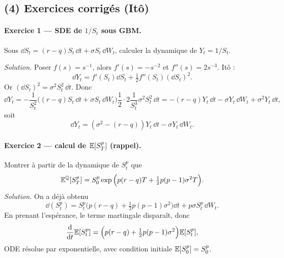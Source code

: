 \subsection*{(4) Exercices corrigés (Itô)}
\paragraph{Exercice 1 --- SDE de $1/S_t$ sous GBM.}
Sous $\dd S_t=(r-q)S_t\,\dd t+\sigma S_t\,\dd W_t$, calculer la dynamique de $Y_t=1/S_t$.

\emph{Solution.}
Poser $f(s)=s^{-1}$, alors $f'(s)=-s^{-2}$ et $f''(s)=2s^{-3}$.
Itô :
\[
\dd Y_t=f'(S_t)\dd S_t+\tfrac12 f''(S_t)(\dd S_t)^2.
\]
Or $(\dd S_t)^2=\sigma^2 S_t^2\,\dd t$.
Donc
\[
\dd Y_t=-\frac{1}{S_t^2}\big((r-q)S_t\,\dd t+\sigma S_t\,\dd W_t\big)
\frac12\cdot 2\frac{1}{S_t^3}\sigma^2 S_t^2\,\dd t
=-(r-q)Y_t\,\dd t-\sigma Y_t\,\dd W_t+\sigma^2 Y_t\,\dd t,
\]
soit
\[
\boxed{\dd Y_t=(\sigma^2-(r-q))Y_t\,\dd t-\sigma Y_t\,\dd W_t.}
\]

\paragraph{Exercice 2 --- calcul de $\mathbb{E}[S_T^p]$ (rappel).}
Montrer à partir de la dynamique de $S_t^p$ que
\[
\mathbb{E}^{\mathbb{Q}}[S_T^p]=S_0^p\exp\Big(p(r-q)T+\tfrac12 p(p-1)\sigma^2T\Big).
\]
\emph{Solution.}
On a déjà obtenu
\[
\dd(S_t^p)=S_t^p\Big(p(r-q)+\tfrac12 p(p-1)\sigma^2\Big)\dd t + p\sigma S_t^p\,\dd W_t.
\]
En prenant l'espérance, le terme martingale disparaît, donc
\[
\frac{\mathrm{d}}{\mathrm{d} t}\mathbb{E}[S_t^p]=\Big(p(r-q)+\tfrac12 p(p-1)\sigma^2\Big)\mathbb{E}[S_t^p],
\]
ODE résolue par exponentielle, avec condition initiale $\mathbb{E}[S_0^p]=S_0^p$.
